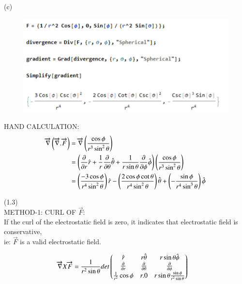 \documentclass[journal,12pt,onecolumn]{IEEEtran}
\theoremstyle{remark}
\begin{document}
(c)\begin{figure}[H]
    \centering
     \includegraphics[scale=0.5]{figs/grad(div).jpeg}
    \caption{}    
    \label{fig:ishitha.em.fig1}
\end{figure} 
HAND CALCULATION:\\
\begin{align}
\overrightarrow{\nabla}\left(\overrightarrow{\nabla}.\overrightarrow{F}\right)&=\overrightarrow{\nabla}\left(\frac{\cos\phi}{r^3\sin^2\theta}\right)\\
&=\left(\frac{\partial}{\partial r}\hat{r}+\frac{1}{r }\frac{\partial}{\partial \theta}\hat{\theta}+\frac{1}{r\sin\theta}\frac{\partial}{\partial \phi}\hat{\phi}\right)\left(\frac{\cos \phi}{r^3 \sin^2 \theta}\right)\\
&= \left(\frac{-3\cos \phi}{r^4\sin^2\theta}\right)\hat{r}-\left(\frac{2\cos \phi \cot \theta}{r^4 \sin^2 \theta}\right)\hat{\theta}+\left(-\frac{\sin \phi}{r^4 \sin^3 \theta}\right)\hat{\phi}
\end{align}

(1.3)\\ 
METHOD-1: CURL OF $\overrightarrow{F}$:\\
If the curl of the electrostatic field is zero, it indicates that electrostatic field is conservative,\\
 ie: $\overrightarrow{F}$ is a valid electrostatic field.
 
\begin{align}
\overrightarrow{\nabla}X\overrightarrow{F}&=
\frac{1}{r^2\sin\theta}det\begin{pmatrix}
\hat{r} & r\hat{\theta} & r\sin\theta\hat{\phi} \\
\frac{\partial}{\partial r}&\frac{\partial}{\partial \theta}&\frac{\partial}{\partial\phi}\\
\frac{1}{r^2}\cos \phi &r.0&r\sin\theta\frac{\sin \phi}{r^2 \sin \theta}
\end{pmatrix}
\end{align}
\end{document}
